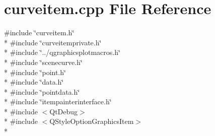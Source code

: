 \section{curveitem.\+cpp File Reference}
\label{curve_2curveitem_8cpp}
{\ttfamily \#include \char`\"{}curveitem.\+h\char`\"{}}\\*
{\ttfamily \#include \char`\"{}curveitemprivate.\+h\char`\"{}}\\*
{\ttfamily \#include \char`\"{}../qgraphicsplotmacros.\+h\char`\"{}}\\*
{\ttfamily \#include \char`\"{}scenecurve.\+h\char`\"{}}\\*
{\ttfamily \#include \char`\"{}point.\+h\char`\"{}}\\*
{\ttfamily \#include \char`\"{}data.\+h\char`\"{}}\\*
{\ttfamily \#include \char`\"{}pointdata.\+h\char`\"{}}\\*
{\ttfamily \#include \char`\"{}itempainterinterface.\+h\char`\"{}}\\*
{\ttfamily \#include $<$Qt\+Debug$>$}\\*
{\ttfamily \#include $<$Q\+Style\+Option\+Graphics\+Item$>$}\\*
